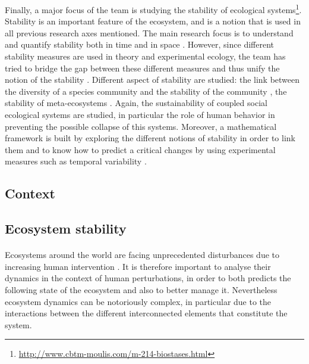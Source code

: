 \documentclass{article}
\begin{document}
Finally, a major focus of the team is studying the stability of ecological systems\footnote{\url{http://www.cbtm-moulis.com/m-214-biostases.html}}. Stability is an important feature of the ecosystem, and is a notion that is used in all previous research axes mentioned. The main research focus is to understand and quantify stability both in time and in space \cite{wang_stability_2017} \cite{zelnik_impact_2018}. However, since different stability measures are used in theory and experimental ecology, the team has tried to bridge the gap between these different measures and thus unify the notion of the stability \cite{arnold_examination_nodate}.
Different aspect of stability are studied: the link between the diversity of a species community and the stability of the community \cite{vallina2017phytoplankton}, the stability of meta-ecosystems \cite{arnoldi_particularity_2016} \cite{lurgi_effects_2016} \cite{wang_biodiversity_2016}.
Again, the sustainability of coupled social ecological systems are studied, in particular the role of human behavior in preventing the possible collapse of this systems.
Moreover, a mathematical framework is built by exploring the different notions of stability in order to link them \cite{arnoldi2016unifying} \cite{donohue_navigating_2016} and to know how to predict a critical changes by using experimental measures such as temporal variability \cite{arnoldi2016resilience} \cite{haegeman_resilience_2016} \cite{wang_invariability-area_2017}. 



\newpage


\subsection*{Context}







\subsection*{Ecosystem stability} %

\paragraph{}
Ecosystems around the world are facing unprecedented disturbances due to increasing human intervention \cite{oosthoek_humanity_2005}. It is therefore important to analyse  their dynamics in the context of human perturbations, in order to both predicts the following state of the ecosystem and also to better manage it.
Nevertheless ecosystem dynamics can be notoriously complex, in particular due to the interactions between the different interconnected elements that constitute the system. %
\end{document}
